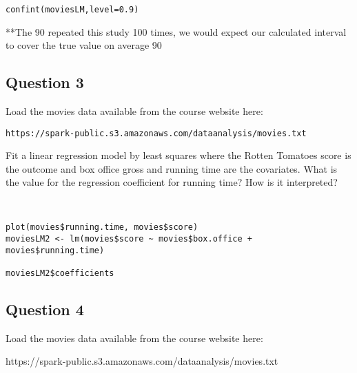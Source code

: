\documentclass[12pt]{article}
\begin{document}
\begin{framed}
\begin{verbatim}
confint(moviesLM,level=0.9)
\end{verbatim}
\end{framed}
**The 90%
repeated this study 100 times, we would expect our calculated interval to cover
the true value on average 90%
\newpage
\subsection*{Question 3}

Load the movies data available from the course website here: 

\begin{verbatim}
https://spark-public.s3.amazonaws.com/dataanalysis/movies.txt 
\end{verbatim}


Fit a linear regression model by least squares where the Rotten Tomatoes score
is the outcome and box office gross and running time are the covariates. What is
the value for the regression coefficient for running time? How is it interpreted?

\begin{framed}
\begin{verbatim}


plot(movies$running.time, movies$score)
moviesLM2 <- lm(movies$score ~ movies$box.office + movies$running.time)

moviesLM2$coefficients
\end{verbatim}
\end{framed}


\newpage
\subsection*{Question 4}

Load the movies data available from the course website here: 

https://spark-public.s3.amazonaws.com/dataanalysis/movies.txt 
\end{document}
